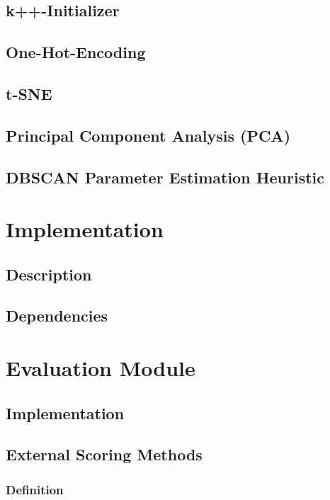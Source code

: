 \documentclass[12pt, english]
{article}
\begin{document}
\subsection{k++-Initializer}

\subsection{One-Hot-Encoding}

\subsection{t-SNE}

\subsection{Principal Component Analysis (PCA)}

\subsection{DBSCAN Parameter Estimation Heuristic} \label{dbscanheuristic}


\section{Implementation}
\subsection{Description}

\subsection{Dependencies}


\section{Evaluation Module}
\subsection{Implementation}

\subsection{External Scoring Methods}
\subsubsection{Definition}

\end{document}
